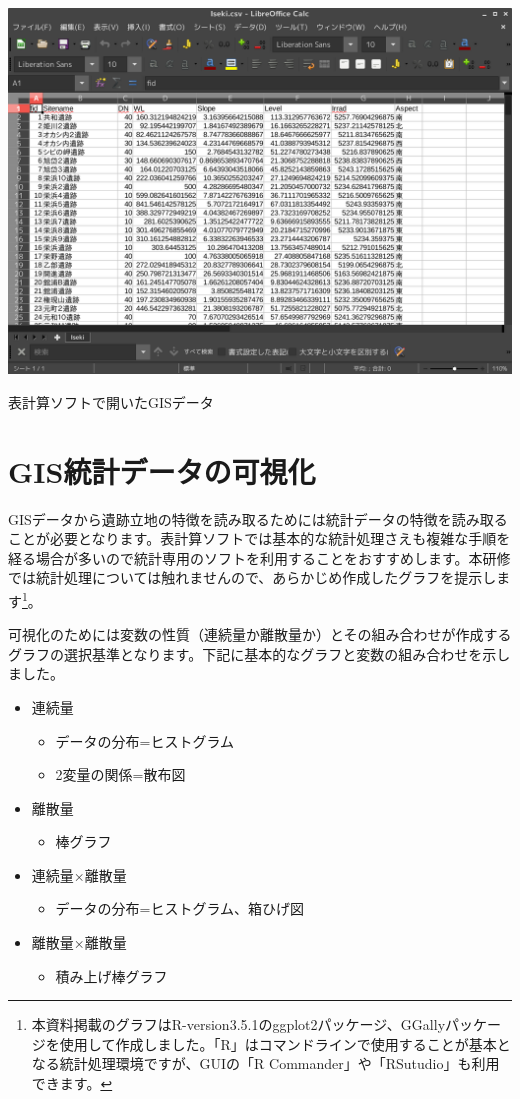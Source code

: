 \documentclass[14Q,twocolumn]{jsarticle}
\makeatletter
\newenvironment{figurehere}
  {\def\@captype{figure}}
  {}
\makeatother
\begin{document}
\begin{figurehere}
\centering
\includegraphics[width=\linewidth]{49.png}
\caption{表計算ソフトで開いたGISデータ}
\end{figurehere}

\section{GIS統計データの可視化}
GISデータから遺跡立地の特徴を読み取るためには統計データの特徴を読み取ることが必要となります。表計算ソフトでは基本的な統計処理さえも複雑な手順を経る場合が多いので統計専用のソフトを利用することをおすすめします。本研修では統計処理については触れませんので、あらかじめ作成したグラフを提示します\footnote{
本資料掲載のグラフはR-version3.5.1のggplot2パッケージ、GGallyパッケージを使用して作成しました。「R」はコマンドラインで使用することが基本となる統計処理環境ですが、GUIの「R Commander」や「RSutudio」も利用できます。
}。

可視化のためには変数の性質（連続量か離散量か）とその組み合わせが作成するグラフの選択基準となります。下記に基本的なグラフと変数の組み合わせを示しました。

\begin{itemize}
\item 連続量
	\begin{itemize}
	\item データの分布=ヒストグラム
	\item 2変量の関係=散布図
	\end{itemize}
\item 離散量
	\begin{itemize}
	\item 棒グラフ
	\end{itemize}
\item 連続量×離散量
	\begin{itemize}
	\item データの分布=ヒストグラム、箱ひげ図
	\end{itemize}
\item 離散量×離散量
	\begin{itemize}
	\item 積み上げ棒グラフ
	\end{itemize}
\end{itemize}
\end{document}
